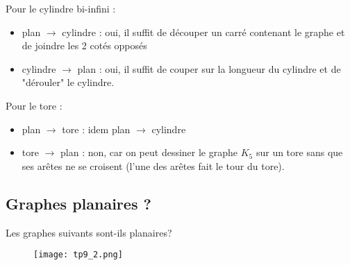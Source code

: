\begin{solution}
Pour le cylindre bi-infini : 
\begin{itemize}
\item plan $\longrightarrow$ cylindre : oui, il suffit de découper un carré contenant le graphe et de joindre les 2 cotés opposés
\item cylindre $\longrightarrow$ plan : oui, il suffit de couper sur la longueur du cylindre et de "dérouler" le cylindre. \\
\end{itemize}

Pour le tore : 
\begin{itemize}
\item plan $\longrightarrow$ tore : idem plan $\longrightarrow$ cylindre
\item tore $\longrightarrow$ plan : non, car on peut dessiner le graphe $K_5$ sur un tore sans que ses arêtes ne se croisent (l'une des arêtes fait le tour du tore).
\end{itemize}
\end{solution}

\subsection{Graphes planaires ?} Les graphes suivants sont-ils planaires?

\begin{figure}[h!]
  \begin{center}
    \texttt{[image: tp9\_2.png]}
      \end{center}
\end{figure}

